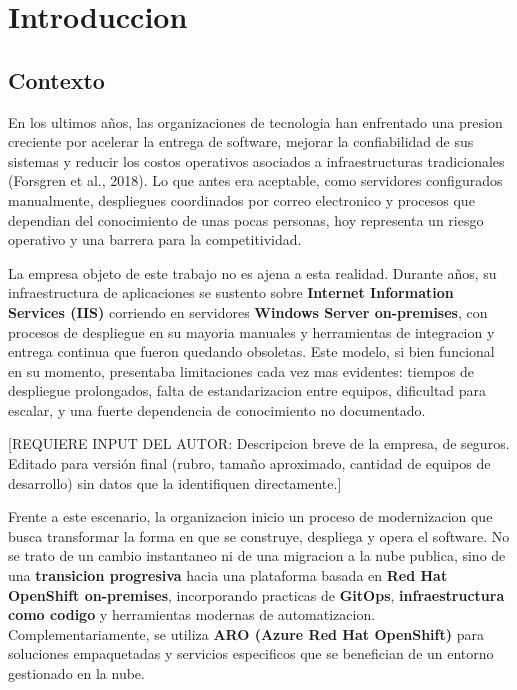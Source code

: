 \hypertarget{introduccion}{%
\chapter{Introduccion}\label{introduccion}}

\hypertarget{contexto}{%
\section{Contexto}\label{contexto}}

En los ultimos años, las organizaciones de tecnologia han enfrentado una
presion creciente por acelerar la entrega de software, mejorar la
confiabilidad de sus sistemas y reducir los costos operativos asociados
a infraestructuras tradicionales (Forsgren et al., 2018). Lo que antes
era aceptable, como servidores configurados manualmente, despliegues
coordinados por correo electronico y procesos que dependian del
conocimiento de unas pocas personas, hoy representa un riesgo operativo
y una barrera para la competitividad.

La empresa objeto de este trabajo no es ajena a esta realidad. Durante
años, su infraestructura de aplicaciones se sustento sobre
\textbf{Internet Information Services (IIS)} corriendo en servidores
\textbf{Windows Server on-premises}, con procesos de despliegue en su
mayoria manuales y herramientas de integracion y entrega continua que
fueron quedando obsoletas. Este modelo, si bien funcional en su momento,
presentaba limitaciones cada vez mas evidentes: tiempos de despliegue
prolongados, falta de estandarizacion entre equipos, dificultad para
escalar, y una fuerte dependencia de conocimiento no documentado.

{[}REQUIERE INPUT DEL AUTOR: Descripcion breve de la empresa, de
seguros. Editado para versión final (rubro, tamaño aproximado, cantidad
de equipos de desarrollo) sin datos que la identifiquen directamente.{]}

Frente a este escenario, la organizacion inicio un proceso de
modernizacion que busca transformar la forma en que se construye,
despliega y opera el software. No se trato de un cambio instantaneo ni
de una migracion a la nube publica, sino de una \textbf{transicion
progresiva} hacia una plataforma basada en \textbf{Red Hat OpenShift
on-premises}, incorporando practicas de \textbf{GitOps},
\textbf{infraestructura como codigo} y herramientas modernas de
automatizacion. Complementariamente, se utiliza \textbf{ARO (Azure Red
Hat OpenShift)} para soluciones empaquetadas y servicios especificos que
se benefician de un entorno gestionado en la nube.

